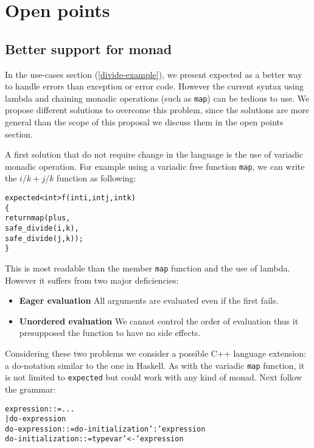 \documentclass[a4paper,10pt]{article}
\newcommand{\cpp}[1]{\lstinline{#1}}
\begin{document}
\section{Open points}

\subsection{Better support for monad}
\label{better-support-for-monad}

In the use-cases section (\ref{divide-example}), we present expected as a better way to handle errors than exception or error code. However the current syntax using lambda and chaining monadic operations (such as \cpp{map}) can be tedious to use. We propose different solutions to overcome this problem, since the solutions are more general than the scope of this proposal we discuss them in the open points section.

A first solution that do not require change in the language is the use of variadic monadic operation. For example using a variadic free function \cpp{map}, we can write the $i/k + j/k$ function as following:

\begin{alltt}
expected<int> f(int i, int j, int k)
\{
  return map(plus,
    safe_divide(i, k), 
    safe_divide(j, k));
\}
\end{alltt}

This is most readable than the member \cpp{map} function and the use of lambda. However it suffers from two major deficiencies:

\begin{itemize}
\item \textbf{Eager evaluation} All arguments are evaluated even if the first fails.
\item \textbf{Unordered evaluation} We cannot control the order of evaluation thus it presupposed the function to have no side effects.
\end{itemize}

Considering these two problems we consider a possible C++ language extension: a do-notation similar to the one in Haskell. As with the variadic \cpp{map} function, it is not limited to \cpp{expected} but could work with any kind of monad. Next follow the grammar:

\begin{alltt}
expression ::= ...
            | do-expression
do-expression ::= do-initialization ':' expression
do-initialization ::= type var '<-' expression
\end{alltt}
\end{document}
